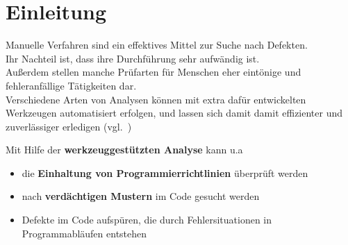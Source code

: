 \section{Einleitung}

Manuelle Verfahren sind ein effektives Mittel zur Suche nach Defekten.\\
Ihr Nachteil ist, dass ihre Durchführung sehr aufwändig ist.\\
Außerdem stellen manche Prüfarten für Menschen eher eintönige und fehleranfällige Tätigkeiten dar.\\

\noindent
Verschiedene Arten von Analysen können mit extra dafür entwickelten Werkzeugen automatisiert erfolgen, und lassen sich damit damit effizienter und zuverlässiger erledigen (vgl.~\cite[27]{Wed09c})

\noindent
Mit Hilfe der \textbf{werkzeuggestützten Analyse} kann u.a

\begin{itemize}
    \item die \textbf{Einhaltung von Programmierrichtlinien} überprüft werden
    \item nach \textbf{verdächtigen Mustern} im Code gesucht werden
    \item Defekte im Code aufspüren, die durch Fehlersituationen in Programmabläufen entstehen
\end{itemize}
